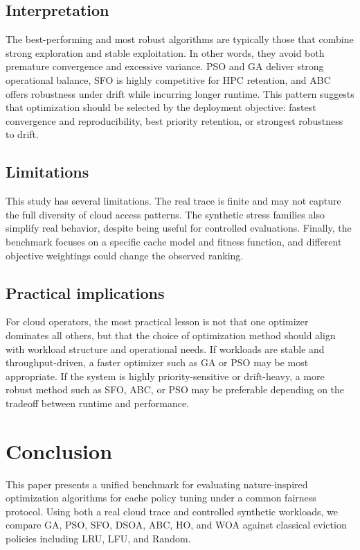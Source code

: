 \documentclass[10pt,journal,compsoc]{IEEEtran}
\begin{document}
\subsection{Interpretation}
The best-performing and most robust algorithms are typically those that combine strong exploration and stable exploitation. In other words, they avoid both premature convergence and excessive variance. PSO and GA deliver strong operational balance, SFO is highly competitive for HPC retention, and ABC offers robustness under drift while incurring longer runtime. This pattern suggests that optimization should be selected by the deployment objective: fastest convergence and reproducibility, best priority retention, or strongest robustness to drift.

\subsection{Limitations}
This study has several limitations. The real trace is finite and may not capture the full diversity of cloud access patterns. The synthetic stress families also simplify real behavior, despite being useful for controlled evaluations. Finally, the benchmark focuses on a specific cache model and fitness function, and different objective weightings could change the observed ranking.

\subsection{Practical implications}
For cloud operators, the most practical lesson is not that one optimizer dominates all others, but that the choice of optimization method should align with workload structure and operational needs. If workloads are stable and throughput-driven, a faster optimizer such as GA or PSO may be most appropriate. If the system is highly priority-sensitive or drift-heavy, a more robust method such as SFO, ABC, or PSO may be preferable depending on the tradeoff between runtime and performance.

\section{Conclusion}
This paper presents a unified benchmark for evaluating nature-inspired optimization algorithms for cache policy tuning under a common fairness protocol. Using both a real cloud trace and controlled synthetic workloads, we compare GA, PSO, SFO, DSOA, ABC, HO, and WOA against classical eviction policies including LRU, LFU, and Random.
\end{document}
